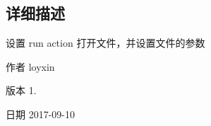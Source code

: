 \subsection{详细描述}
设置 run action 打开文件，并设置文件的参数 

\begin{DoxyAuthor}{作者}
loyxin 
\end{DoxyAuthor}
\begin{DoxyVersion}{版本}
1. 
\end{DoxyVersion}
\begin{DoxyDate}{日期}
2017-\/09-\/10 
\end{DoxyDate}
